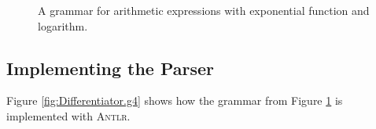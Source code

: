 \begin{figure}[htbp]
  \begin{center}    
  \end{center}
  \caption{A grammar for arithmetic expressions with exponential function and logarithm.}
  \label{fig:Expr-exp-ln}
\end{figure}

\subsection{Implementing the Parser}
Figure \ref{fig:Differentiator.g4} shows how the grammar from Figure \ref{fig:Expr-exp-ln} is implemented with \textsc{Antlr}.  

